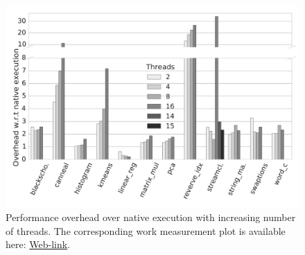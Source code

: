 
\begin{figure}[t]
\centering
\includegraphics[scale=0.25]{figure/benchmarks/times-Total_overheads.pdf}
\caption{Performance overhead  over native execution with increasing number of threads. The corresponding work measurement plot is available here: \href{https://mic92.github.io/inspector/index.html\#graph2}{Web-link}.}
\label{fig:overheads}
\end{figure}

